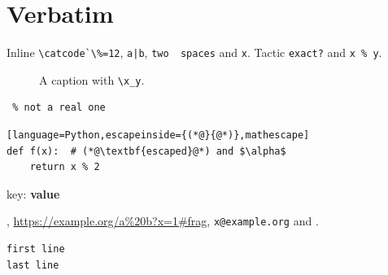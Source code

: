 \section{Verbatim}
Inline \verb|\catcode`\%=12|, \verb!a|b!, \verb*|two  spaces| and \verb+x+.
Tactic \lstinline{exact?} and \lstinline!x % y!.
\begin{figure}[h]
\centering{}
\cprotect\caption{A caption with \verb|\x_y|.}
\end{figure}
{\small\begin{verbatim}
 % not a real one
\end{verbatim}
}
\begin{lstlisting}[language=Python,escapeinside={(*@}{@*)},mathescape]
def f(x):  # (*@\textbf{escaped}@*) and $\alpha$
    return x % 2
\end{lstlisting}
\begin{gmcode}[language={[LaTeX]TeX}]
\makeatletter \def\x{%
\end{gmcode}
\begin{cfgblock}
key: \textbf{value}   %
\end{cfgblock}
, \url{https://example.org/a%20b?x=1#frag}, \nolinkurl{x@example.org}
and \detokenize{\[ \mathrm{CH_2} \]}.
\begin{verbatim}
first line
last line\end{verbatim}

